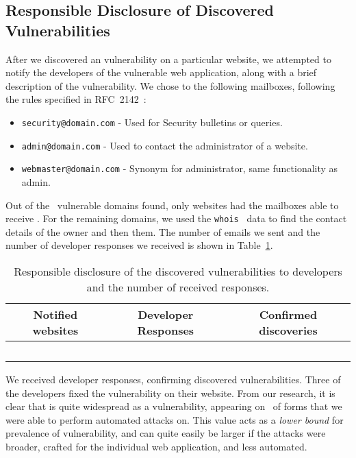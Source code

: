 \subsection{Responsible Disclosure of Discovered Vulnerabilities}
After we discovered an \ehi vulnerability on a particular website, we attempted to notify the developers of the vulnerable web application, along with a brief description of the vulnerability.
We chose to \email the following mailboxes, following the rules specified in RFC~2142~\cite{rfc2142}:
\begin{itemize}
	\item \texttt{security@domain.com} - Used for Security bulletins or queries.
	\item \texttt{admin@domain.com} - Used to contact the administrator of a website.
	\item \texttt{webmaster@domain.com} - Synonym for administrator, same functionality as admin.
\end{itemize}

Out of the \domains\ vulnerable domains found, only \emailedDefaultmailbox websites had the mailboxes able to receive \emails. For the remaining domains, we used the \texttt{whois}~\cite{whois} data to find the contact details of the owner and then \emailed them. The number of emails we sent and the number of developer responses we received is shown in Table~\ref{tab:devresp}.

\begin{table}[tbp]
\centering
\normalsize
\begin{tabular}{|c|c|c|}
	\hline
	\multicolumn{1}{|p{2cm}}{\centering \textbf{Notified websites}} &
	\multicolumn{1}{|p{2cm}|}{\centering \textbf{Developer Responses}} &
	\multicolumn{1}{p{2cm}|}{\centering \textbf{Confirmed discoveries}}\\
	\hline
	\domains\ & \responses & \confirmed \\
	\hline
\end{tabular}
	\caption[\titlecap{}]{Responsible disclosure of the discovered vulnerabilities to developers and the number of received responses.}
	\label{tab:devresp}
\end{table}

We received \responses developer responses, confirming \confirmed discovered vulnerabilities. Three of the developers fixed the vulnerability on their website.
From our research, it is clear that \ehi is quite widespread as a vulnerability, appearing on \successDelta\ of forms that we were able to perform automated attacks on. This value acts as a \emph{lower bound} for prevalence of \ehi vulnerability, and can quite easily be larger if the attacks were broader, crafted for the individual web application, and  less automated. 
